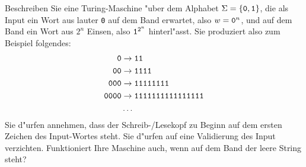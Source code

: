 Beschreiben Sie eine Turing-Maschine "uber dem Alphabet
$\Sigma=\{\text{\tt 0},\text{\tt 1}\}$, die als Input ein Wort
aus lauter {\tt 0} auf dem Band erwartet, also $w=\text{\tt 0}^n$,
und auf dem Band ein Wort aus $2^n$ Einsen, also $\text{\tt 1}^{2^n}$ hinterl"asst. Sie
produziert also zum Beispiel folgendes:
\begin{align*}
\text{\tt 0}&\rightarrow\text{\tt 11}\\
\text{\tt 00}&\rightarrow\text{\tt 1111}\\
\text{\tt 000}&\rightarrow\text{\tt 11111111}\\
\text{\tt 0000}&\rightarrow\text{\tt 1111111111111111}\\
&\dots
\end{align*}
Sie d"urfen annehmen, dass der Schreib-/Lesekopf zu Beginn auf dem
ersten Zeichen des Input-Wortes steht. Sie d"urfen auf eine
Validierung des Input verzichten. Funktioniert Ihre Maschine auch,
wenn auf dem Band der leere String steht?


